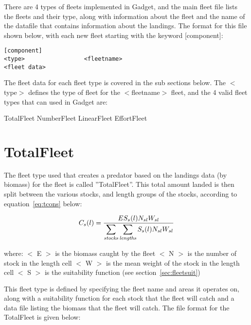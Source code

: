 \documentclass[10pt,twoside]{book}
\begin{document}
There are 4 types of fleets implemented in Gadget, and the main fleet file lists the fleets and their type, along with information about the fleet and the name of the datafile that contains information about the landings.  The format for this file shown below, with each new fleet starting with the keyword [component]:

{\small\begin{verbatim}
[component]
<type>                 <fleetname>
<fleet data>
\end{verbatim}}

The fleet data for each fleet type is covered in the sub sections below.  The $<$type$>$ defines the type of fleet for the $<$fleetname$>$ fleet, and the 4 valid fleet types that can used in Gadget are:

\bigskip
TotalFleet\newline
NumberFleet\newline
LinearFleet\newline
EffortFleet

\section{TotalFleet}\label{sec:totalfleet}
The fleet type used that creates a predator based on the landings data (by biomass) for the fleet is called ''TotalFleet''.  This total amount landed is then split between the various stocks, and length groups of the stocks, according to equation~\ref{eq:tcons} below:

\begin{equation}\label{eq:tcons}
C_{s}(l) = \frac{E S_{s}(l) N_{sl} W_{sl}}{\displaystyle \sum_{\it stocks} \sum_{\it lengths} S_{s}(l) N_{sl} W_{sl}}
\end{equation}

where:\newline
$<$ E $>$ is the biomass caught by the fleet\newline
$<$ N $>$ is the number of stock in the length cell\newline
$<$ W $>$ is the mean weight of the stock in the length cell\newline
$<$ S $>$ is the suitability function (see section~\ref{sec:fleetsuit})

\bigskip
This fleet type is defined by specifying the fleet name and areas it operates on, along with a suitability function for each stock that the fleet will catch and a data file listing the biomass that the fleet will catch.  The file format for the TotalFleet is given below:
\end{document}

